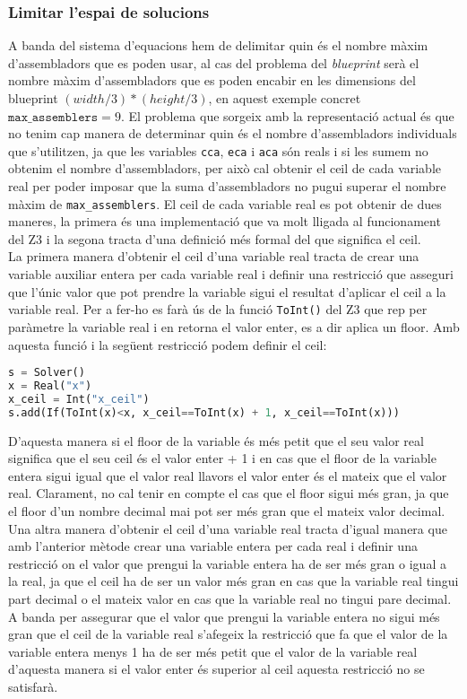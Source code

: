 \subsubsection{Limitar l'espai de solucions}
A banda del sistema d'equacions hem de delimitar quin és el nombre màxim d'assembladors que es poden usar, al cas del problema del \textit{blueprint} serà el nombre màxim d'assembladors que es poden encabir en les dimensions del blueprint $(width/3) * (height/3)$, en aquest exemple concret $\texttt{max\_assemblers} = 9$. El problema que sorgeix amb la representació actual és que no tenim cap manera de determinar quin és el nombre d'assembladors individuals que s'utilitzen, ja que les variables \texttt{cca}, \texttt{eca} i \texttt{aca} són reals i si les sumem no obtenim el nombre d'assembladors, per això cal obtenir el ceil de cada variable real per poder imposar que la suma d'assembladors no pugui superar el nombre màxim de \texttt{max\_assemblers}. El ceil de cada variable real es pot obtenir de dues maneres, la primera és una implementació que va molt lligada al funcionament del Z3 i la segona tracta d'una definició més formal del que significa el ceil.\\

La primera manera d'obtenir el ceil d'una variable real tracta de crear una variable auxiliar entera per cada variable real i definir una restricció que asseguri que l'únic valor que pot prendre la variable sigui el resultat d'aplicar el ceil a la variable real. Per a fer-ho es farà ús de la funció \texttt{ToInt()} del Z3 que rep per paràmetre la variable real i en retorna el valor enter, es a dir aplica un floor. Amb aquesta funció i la següent restricció podem definir el ceil:

\begin{lstlisting}[language=Python, caption=Ceil implementation 1]
s = Solver()
x = Real("x")
x_ceil = Int("x_ceil")
s.add(If(ToInt(x)<x, x_ceil==ToInt(x) + 1, x_ceil==ToInt(x)))
\end{lstlisting}

D'aquesta manera si el floor de la variable és més petit que el seu valor real significa que el seu ceil és el valor enter + 1 i en cas que el floor de la variable entera sigui igual que el valor real llavors el valor enter és el mateix que el valor real. Clarament, no cal tenir en compte el cas que el floor sigui més gran, ja que el floor d'un nombre decimal mai pot ser més gran que el mateix valor decimal.\\

Una altra manera d'obtenir el ceil d'una variable real tracta d'igual manera que amb l'anterior mètode crear una variable entera per cada real i definir una restricció on el valor que prengui la variable entera ha de ser més gran o igual a la real, ja que el ceil ha de ser un valor més gran en cas que la variable real tingui part decimal o el mateix valor en cas que la variable real no tingui pare decimal. A banda per assegurar que el valor que prengui la variable entera no sigui més gran que el ceil de la variable real s'afegeix la restricció que fa que el valor de la variable entera menys 1 ha de ser més petit que el valor de la variable real d'aquesta manera si el valor enter és superior al ceil aquesta restricció no se satisfarà.

